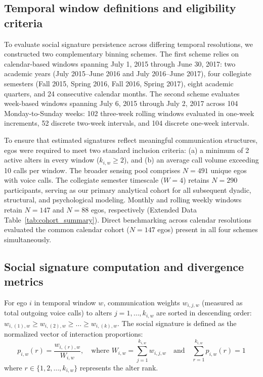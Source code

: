 \documentclass[11pt,letterpaper]{article}
\begin{document}
\subsection*{Temporal window definitions and eligibility criteria}
To evaluate social signature persistence across differing temporal resolutions, we constructed two complementary binning schemes. The first scheme relies on calendar-based windows spanning July 1, 2015 through June 30, 2017: two academic years (July 2015--June 2016 and July 2016--June 2017), four collegiate semesters (Fall 2015, Spring 2016, Fall 2016, Spring 2017), eight academic quarters, and 24 consecutive calendar months. The second scheme evaluates week-based windows spanning July 6, 2015 through July 2, 2017 across 104 Monday-to-Sunday weeks: 102 three-week rolling windows evaluated in one-week increments, 52 discrete two-week intervals, and 104 discrete one-week intervals.

To ensure that estimated signatures reflect meaningful communication structures, egos were required to meet two standard inclusion criteria: (a) a minimum of 2 active alters in every window ($k_{i,w} \ge 2$), and (b) an average call volume exceeding 10 calls per window. The broader sensing pool comprises $N = 491$ unique egos with voice calls. The collegiate semester timescale ($W = 4$) retains $N = 290$ participants, serving as our primary analytical cohort for all subsequent dyadic, structural, and psychological modeling. Monthly and rolling weekly windows retain $N = 147$ and $N = 88$ egos, respectively (Extended Data Table~\ref{tab:cohort_summary}). Direct benchmarking across calendar resolutions evaluated the common calendar cohort ($N = 147$ egos) present in all four schemes simultaneously.

\subsection*{Social signature computation and divergence metrics}
For ego $i$ in temporal window $w$, communication weights $w_{i,j,w}$ (measured as total outgoing voice calls) to alters $j = 1, \dots, k_{i,w}$ are sorted in descending order: $w_{i,(1),w} \ge w_{i,(2),w} \ge \dots \ge w_{i,(k),w}$. The social signature is defined as the normalized vector of interaction proportions:
\begin{equation}
p_{i,w}(r) = \frac{w_{i,(r),w}}{W_{i,w}}, \quad \text{where } W_{i,w} = \sum_{j=1}^{k_{i,w}} w_{i,j,w} \quad \text{and} \quad \sum_{r=1}^{k_{i,w}} p_{i,w}(r) = 1
\end{equation}
where $r \in \{1, 2, \dots, k_{i,w}\}$ represents the alter rank.
\end{document}
